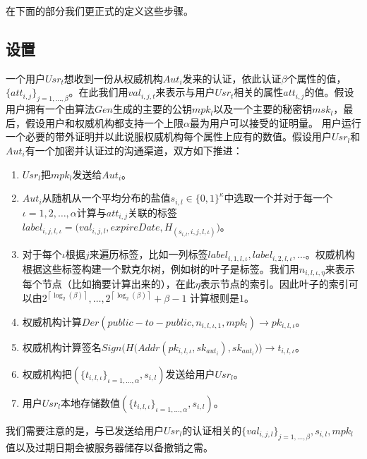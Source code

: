 \documentclass[UTF8]{ctexart}
\def\lc{\left\lceil}
\def\rc{\right\rceil}
\begin{document}
在下面的部分我们更正式的定义这些步骤。
\subsection{设置}
一个用户$Usr_t$想收到一份从权威机构$Aut_i$发来的认证，依此认证$\beta$个属性的值，$\{att_{i, j}\}_{j = 1, \ldots, \beta}$。在此我们用$val_{i, j , t}$来表示与用户$Usr_t$相关的属性$att_{i, j}$的值。假设用户拥有一个由算法$Gen$生成的主要的公钥$mpk_l$以及一个主要的秘密钥$msk_l$，最后，假设用户和权威机构都支持一个上限$\alpha$最为用户可以接受的证明量。
用户运行一个必要的带外证明并以此说服权威机构每个属性上应有的数值。假设用户$Usr_l$和$Aut_i$有一个加密并认证过的沟通渠道，双方如下推进：
\begin{enumerate}
\item $Usr_l$把$mpk_l$发送给$Aut_i$。
\item $Aut_i$从随机从一个平均分布的盐值$s_{i, l} \in \{0,1\}^\kappa$中选取一个并对于每一个$\iota = 1, 2, \ldots, \alpha$计算与$att_{i, j}$关联的标签$label_{i,j, l, \iota} = \big(val_{i,j,l}, expireDate, H_{(s_{i, l}, i, j, l, \iota)}\big)$。
\item 对于每个$\iota$根据$j$来遍历标签，比如一列标签$label_{i,1,l,\iota}, label_{i,2,l,\iota}, \ldots$。权威机构根据这些标签构建一个默克尔树，例如树的叶子是标签。我们用$n_{i, l, \iota, \eta}$来表示每个节点（比如摘要计算出来的），在此$\eta$表示节点的索引。因此叶子的索引可以由$2^{\lc\log_2(\beta)\rc},\ldots,2^{\lc\log_2(\beta)\rc} + \beta - 1$ 计算根则是$1$。
\item 权威机构计算$Der(public-to-public, n_{i, l, \iota, 1},mpk_l) \to pk_{i, l, \iota}$。
\item 权威机构计算签名$Sign\big(H\big(Addr(pk_{i, l,\iota}, sk_{aut_i}),sk_{aut_i}\big)\big) \to t_{i, l, \iota}$。
\item 权威机构把$(\{t_{i, l,\iota}\}_{\iota = 1, \ldots, \alpha}, s_{i, l})$发送给用户$Usr_l$。
\item 用户$Usr_l$本地存储数值$(\{t_{i, l,\iota}\}_{\iota = 1, \ldots, \alpha}, s_{i, l})$。
\end{enumerate}
我们需要注意的是，与已发送给用户$Usr_l$的认证相关的$\{val_{i, j, l}\}_{j = 1, \ldots, \beta}, s_{i, l}, mpk_l$值以及过期日期会被服务器储存以备撤销之需。
\end{document}
